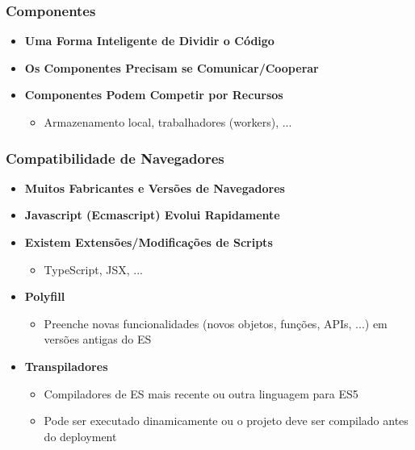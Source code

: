 \documentclass{beamer}
\begin{document}
\begin{frame}
      \frametitle{Componentes}

      \begin{itemize}
            \item \textbf{Uma Forma Inteligente de Dividir o Código}

            \item \textbf{Os Componentes Precisam se Comunicar/Cooperar}

            \item \textbf{Componentes Podem Competir por Recursos}
                  \begin{itemize}
                        \item Armazenamento local, trabalhadores (workers), ...
                  \end{itemize}
      \end{itemize}

\end{frame}
\begin{frame}
      \frametitle{Compatibilidade de Navegadores}

      \begin{itemize}
            \item \textbf{Muitos Fabricantes e Versões de Navegadores}

            \item \textbf{Javascript (Ecmascript) Evolui Rapidamente}

            \item \textbf{Existem Extensões/Modificações de Scripts}
                  \begin{itemize}
                        \item TypeScript, JSX, ...
                  \end{itemize}

            \item \textbf{Polyfill}
                  \begin{itemize}
                        \item Preenche novas funcionalidades (novos objetos, funções, APIs, ...) em versões antigas do ES
                  \end{itemize}

            \item \textbf{Transpiladores}
                  \begin{itemize}
                        \item Compiladores de ES mais recente ou outra linguagem para ES5
                        \item Pode ser executado dinamicamente ou o projeto deve ser compilado antes do deployment
                  \end{itemize}
      \end{itemize}

\end{frame}
\end{document}
